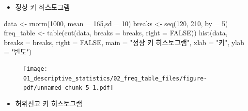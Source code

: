 \documentclass[
  letterpaper,
  DIV=11,
  numbers=noendperiod]{scrreprt}
\newenvironment{Shaded}{\begin{snugshade}}{\end{snugshade}}
\newcommand{\AttributeTok}[1]{\textcolor[rgb]{0.40,0.45,0.13}{#1}}
\newcommand{\ConstantTok}[1]{\textcolor[rgb]{0.56,0.35,0.01}{#1}}
\newcommand{\DecValTok}[1]{\textcolor[rgb]{0.68,0.00,0.00}{#1}}
\newcommand{\FunctionTok}[1]{\textcolor[rgb]{0.28,0.35,0.67}{#1}}
\newcommand{\NormalTok}[1]{\textcolor[rgb]{0.00,0.23,0.31}{#1}}
\newcommand{\OtherTok}[1]{\textcolor[rgb]{0.00,0.23,0.31}{#1}}
\newcommand{\StringTok}[1]{\textcolor[rgb]{0.13,0.47,0.30}{#1}}
\providecommand{\tightlist}{%
  \setlength{\itemsep}{0pt}\setlength{\parskip}{0pt}}\usepackage{longtable,booktabs,array}
\begin{document}
\begin{itemize}
\tightlist
\item
  정상 키 히스토그램
\end{itemize}

\begin{Shaded}
\begin{Highlighting}[]
\NormalTok{data }\OtherTok{\textless{}{-}} \FunctionTok{rnorm}\NormalTok{(}\DecValTok{1000}\NormalTok{, }\AttributeTok{mean =} \DecValTok{165}\NormalTok{,}\AttributeTok{sd =} \DecValTok{10}\NormalTok{)}
\NormalTok{breaks }\OtherTok{\textless{}{-}} \FunctionTok{seq}\NormalTok{(}\DecValTok{120}\NormalTok{, }\DecValTok{210}\NormalTok{, }\AttributeTok{by =} \DecValTok{5}\NormalTok{)}
\NormalTok{freq\_table }\OtherTok{\textless{}{-}} \FunctionTok{table}\NormalTok{(}\FunctionTok{cut}\NormalTok{(data, }\AttributeTok{breaks =}\NormalTok{ breaks, }\AttributeTok{right =} \ConstantTok{FALSE}\NormalTok{))}
\FunctionTok{hist}\NormalTok{(data, }\AttributeTok{breaks =}\NormalTok{ breaks, }\AttributeTok{right =} \ConstantTok{FALSE}\NormalTok{, }\AttributeTok{main =} \StringTok{"정상 키 히스토그램"}\NormalTok{, }\AttributeTok{xlab =} \StringTok{"키"}\NormalTok{, }\AttributeTok{ylab =} \StringTok{"빈도"}\NormalTok{)}
\end{Highlighting}
\end{Shaded}

\begin{figure}[H]

{\centering \texttt{[image: 01\_descriptive\_statistics/02\_freq\_table\_files/figure-pdf/unnamed-chunk-5-1.pdf]}

}

\end{figure}

\begin{itemize}
\tightlist
\item
  허위신고 키 히스토그램
\end{itemize}
\end{document}
